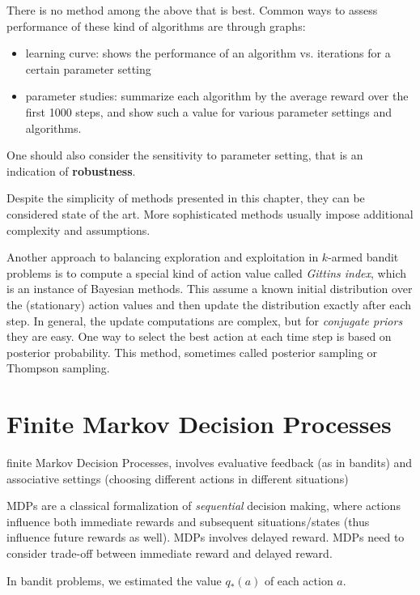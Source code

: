 \documentclass[lang=en,mode=geye,device=normal,color=blue,14pt]{elegantnote}
\DeclareMathOperator*{\1}{\mathbbm{1}}
\begin{document}
There is no method among the above that is best. Common ways to assess performance of these kind of algorithms are through graphs:
\begin{itemize}
\item learning curve: shows the performance of an algorithm vs. iterations for a certain parameter setting
\item parameter studies: summarize each algorithm by the average reward over the first 1000 steps, and show such a value for various parameter settings and algorithms.
\end{itemize}

One should also consider the sensitivity to parameter setting, that is an indication of \textbf{robustness}.

Despite the simplicity of methods presented in this chapter, they can be considered state of the art. More sophisticated methods usually impose additional complexity and assumptions.

Another approach to balancing exploration and exploitation in $k$-armed bandit problems is to compute a special kind of action value called \textit{Gittins index}, which is an instance of Bayesian methods. This assume a known initial distribution over the (stationary) action values and then update the distribution exactly after each step.
In general, the update computations are complex, but for \textit{conjugate priors} they are easy.
One way to select the best action at each time step is based on posterior probability.
This method, sometimes called posterior sampling or Thompson sampling.

\section{Finite Markov Decision Processes}

\begin{definition}
finite Markov Decision Processes, involves evaluative feedback (as in bandits) and associative settings (choosing different actions in different situations)
\end{definition}

MDPs are a classical formalization of \textit{sequential} decision making, where actions influence both immediate rewards and subsequent situations/states (thus influence future rewards as well).
MDPs involves delayed reward. MDPs need to consider trade-off between immediate reward and delayed reward.

In bandit problems, we estimated the value $q_{*}(a)$ of each action $a$.
\end{document}
